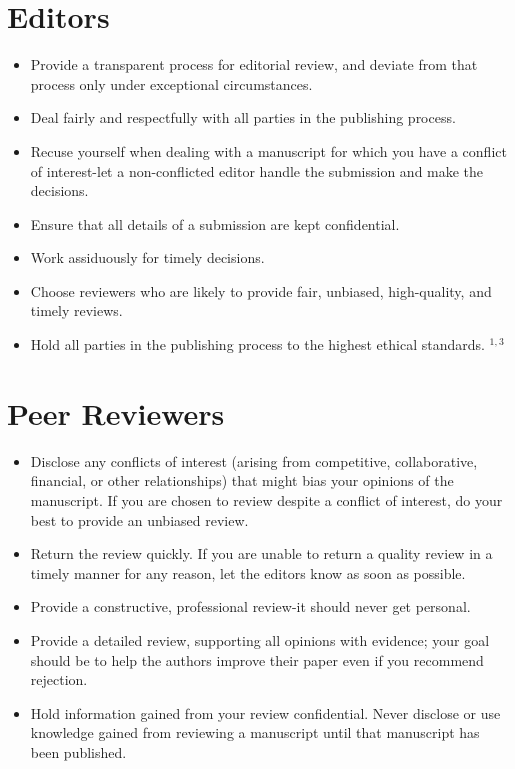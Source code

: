 \section*{Editors}
\begin{itemize}
  \item Provide a transparent process for editorial review, and deviate from that process only under exceptional circumstances.
  \item Deal fairly and respectfully with all parties in the publishing process.
  \item Recuse yourself when dealing with a manuscript for which you have a conflict of interest-let a non-conflicted editor handle the submission and make the decisions.
  \item Ensure that all details of a submission are kept confidential.
  \item Work assiduously for timely decisions.
  \item Choose reviewers who are likely to provide fair, unbiased, high-quality, and timely reviews.
  \item Hold all parties in the publishing process to the highest ethical standards. ${ }^{1,3}$
\end{itemize}

\section*{Peer Reviewers}
\begin{itemize}
  \item Disclose any conflicts of interest (arising from competitive, collaborative, financial, or other relationships) that might bias your opinions of the manuscript. If you are chosen to review despite a conflict of interest, do your best to provide an unbiased review.
  \item Return the review quickly. If you are unable to return a quality review in a timely manner for any reason, let the editors know as soon as possible.
  \item Provide a constructive, professional review-it should never get personal.
  \item Provide a detailed review, supporting all opinions with evidence; your goal should be to help the authors improve their paper even if you recommend rejection.
  \item Hold information gained from your review confidential. Never disclose or use knowledge gained from reviewing a manuscript until that manuscript has been published.
\end{itemize}

